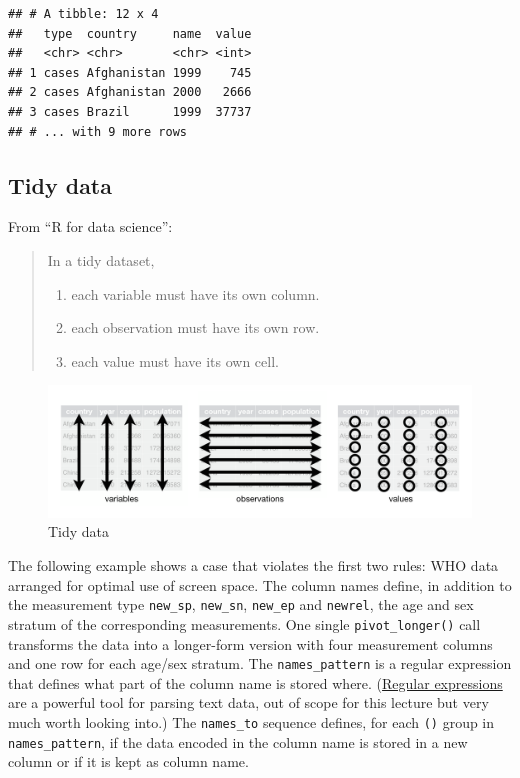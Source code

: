\documentclass[]{book}
\providecommand{\tightlist}{%
  \setlength{\itemsep}{0pt}\setlength{\parskip}{0pt}}
\begin{document}
\begin{verbatim}
## # A tibble: 12 x 4
##   type  country     name  value
##   <chr> <chr>       <chr> <int>
## 1 cases Afghanistan 1999    745
## 2 cases Afghanistan 2000   2666
## 3 cases Brazil      1999  37737
## # ... with 9 more rows
\end{verbatim}

\hypertarget{tidy-data}{%
\subsection{Tidy data}\label{tidy-data}}

From ``R for data science'':

\begin{quote}
In a tidy dataset,

\begin{enumerate}
\def\labelenumi{\arabic{enumi}.}
\tightlist
\item
  each variable must have its own column.
\item
  each observation must have its own row.
\item
  each value must have its own cell.
\end{enumerate}
\end{quote}

\begin{figure}
\centering
\includegraphics{img/tidy-1.png}
\caption{Tidy data}
\end{figure}

The following example shows a case that violates the first two rules: WHO data arranged for optimal use of screen space.
The column names define, in addition to the measurement type \texttt{new\_sp}, \texttt{new\_sn}, \texttt{new\_ep} and \texttt{newrel}, the age and sex stratum of the corresponding measurements.
One single \texttt{pivot\_longer()} call transforms the data into a longer-form version with four measurement columns and one row for each age/sex stratum.
The \texttt{names\_pattern} is a regular expression that defines what part of the column name is stored where.
(\href{https://en.wikipedia.org/wiki/Regular_expression}{Regular expressions} are a powerful tool for parsing text data, out of scope for this lecture but very much worth looking into.)
The \texttt{names\_to} sequence defines, for each \texttt{()} group in \texttt{names\_pattern}, if the data encoded in the column name is stored in a new column or if it is kept as column name.
\end{document}
